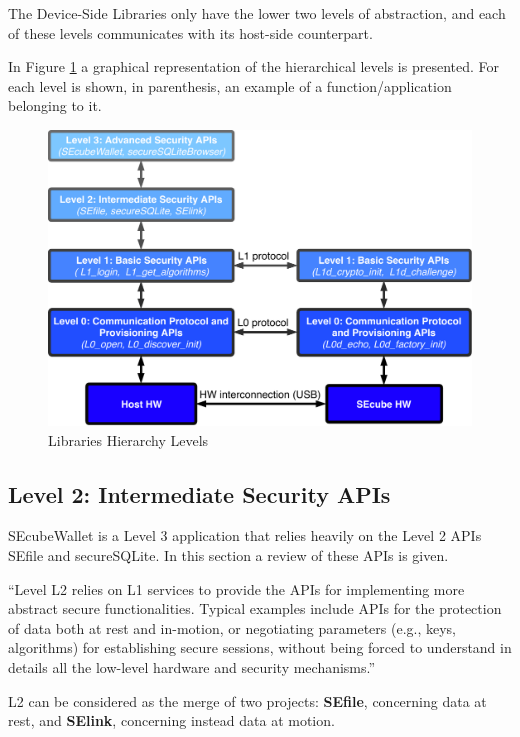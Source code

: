The Device-Side Libraries only have the lower two levels of abstraction, and each of these levels communicates with its host-side counterpart.

In Figure \ref{fig:levels} a graphical representation of the hierarchical levels is presented. For each level is shown, in parenthesis, an example of a function/application belonging to it.

\begin{figure}[htb]
  \centering
  \captionsetup{justification=centering}
  \centerline{\includegraphics[width=\columnwidth]{chapters/figures/frameworks/levels.pdf}}
  \caption{Libraries Hierarchy Levels}
  \label{fig:levels}
\end{figure}

\subsection{Level 2: Intermediate Security APIs}

SEcubeWallet is a Level 3 application that relies heavily on the Level 2 APIs SEfile and secureSQLite. In this section a review of these APIs is given.

``Level L2 relies on L1 services to provide the APIs for implementing more abstract secure functionalities. Typical examples include APIs for the protection of data both at rest and in-motion, or negotiating parameters (e.g., keys, algorithms) for establishing secure sessions, without being forced to understand in details all the low-level hardware and security mechanisms.''\cite{L2UserMan}

L2 can be considered as the merge of two projects: \textbf{SEfile}, concerning data at rest, and \textbf{SElink}, concerning instead data at motion. 

